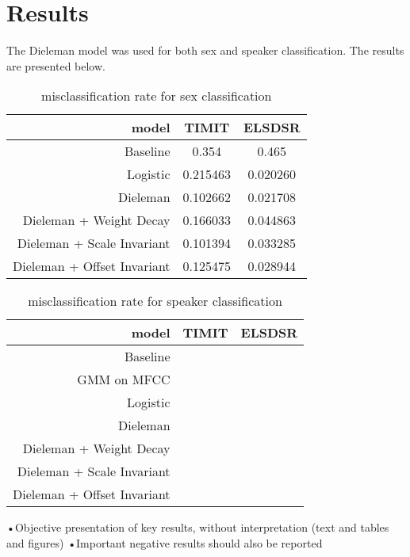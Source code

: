 \section{Results}

The Dieleman model was used for both sex and speaker classification. The results are presented below.
\begin{table}[H]
\centering
\begin{tabular}{r|c|c}
	model & TIMIT & ELSDSR \\ \hline
	Baseline & 0.354 & 0.465 \\
	Logistic & 0.215463 & 0.020260 \\
	Dieleman & 0.102662 & 0.021708 \\
	Dieleman + Weight Decay     & 0.166033 & 0.044863 \\
	Dieleman + Scale Invariant  & 0.101394 & 0.033285 \\
	Dieleman + Offset Invariant & 0.125475 & 0.028944
\end{tabular}
\caption{misclassification rate for sex classification}
\end{table}

\begin{table}[H]
\centering
\begin{tabular}{r|c|c}
	model & TIMIT & ELSDSR \\ \hline
	Baseline & \\
	GMM on MFCC & \\
	Logistic & \\
	Dieleman & \\
	Dieleman + Weight Decay     & \\
	Dieleman + Scale Invariant  & \\
	Dieleman + Offset Invariant &
\end{tabular}
\caption{misclassification rate for speaker classification}
\end{table}

•Objective presentation of key results, without interpretation (text and tables
and figures)
•Important negative results should also be reported
